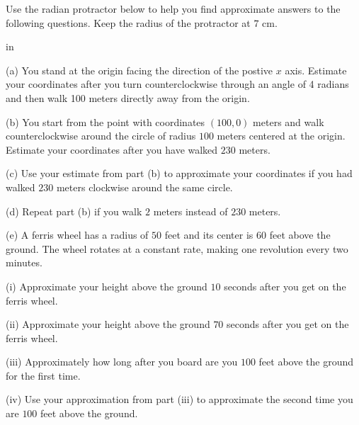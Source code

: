 \documentclass{ximera}
\newcommand{\pskip}{\vskip 0.1 in}
\begin{document}
\begin{question}  \label{Q4P:Angles}
Use the radian protractor below to help you find approximate answers to the following questions. Keep the radius of the protractor at $7$ cm.

\pskip

(a) You stand at the origin facing the direction of the postive $x$ axis. Estimate your coordinates after you turn counterclockwise through an angle of 4 radians and then walk 100 meters directly away from the origin.

(b) You start from the point with coordinates $(100,0)$ meters and walk counterclockwise around the circle of radius $100$ meters centered at the origin. Estimate your coordinates after you have walked $230$ meters.

(c) Use your estimate from part (b) to approximate your coordinates if you had walked $230$ meters clockwise around the same circle.

(d) Repeat part (b) if you walk $2$ meters instead of $230$ meters.

(e) A ferris wheel has a radius of $50$ feet and its center is $60$ feet above the ground. The wheel rotates at a constant rate, making one revolution every two minutes.

(i) Approximate your height above the ground $10$ seconds after you get on the ferris wheel. 

(ii) Approximate your height above the ground $70$ seconds after you get on the ferris wheel. 

(iii) Approximately how long after you board are you $100$ feet above the ground for the first time.

(iv) Use your approximation from part (iii) to approximate the second time you are $100$ feet above the ground.


\begin{exploration}
 
\begin{onlineOnly}
    \begin{center}
\end{center}
\end{onlineOnly}
\end{exploration}

\end{question}
\end{document}
